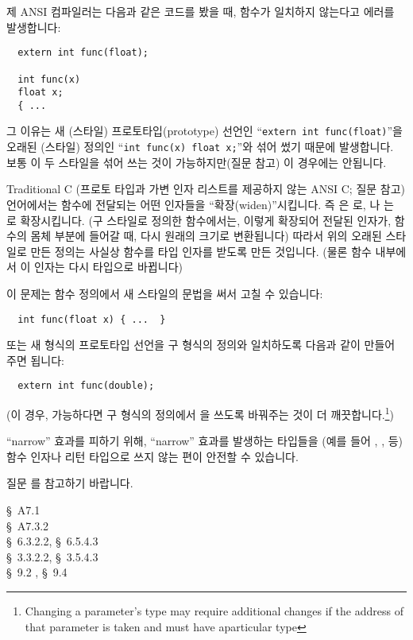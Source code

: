 \begin{faq}
	제 ANSI 컴파일러는 다음과 같은 코드를 봤을 때, 함수가 일치하지 않는다고
	에러를 발생합니다:

\begin{verbatim}
  extern int func(float);

  int func(x)
  float x;
  { ...
\end{verbatim}

\A
        \begin{sloppypar}
	그 이유는 새 (스타일) 프로토타입(prototype) 선언인
	``\verb+extern int func(float)+''을 오래된 (스타일) 정의인
	``\verb+int func(x) float x;+''와 섞어 썼기 때문에 발생합니다.
	보통 이 두 스타일을 섞어 쓰는 것이 가능하지만(질문  참고)
	이 경우에는 안됩니다.

	Traditional C (프로토 타입과 가변 인자 리스트를 제공하지 않는 ANSI C;
	질문  참고) 언어에서는 함수에 전달되는 어떤 인자들을
	``확장(widen)''시킵니다.  즉 은 로,
	나 는 로 확장시킵니다.
	(구 스타일로 정의한 함수에서는, 이렇게 확장되어 전달된 인자가,
	함수의 몸체 부분에 들어갈 때, 다시 원래의 크기로 변환됩니다)
        따라서 위의 오래된 스타일로 만든 정의는 사실상  함수를
         타입 인자를 받도록 만든 것입니다. (물론 함수 내부에서
        이 인자는 다시  타입으로 바뀝니다)
        \end{sloppypar}
	이 문제는 함수 정의에서 새 스타일의 문법을 써서 고칠 수 있습니다:
\begin{verbatim}
  int func(float x) { ...  }
\end{verbatim}

	또는 새 형식의 프로토타입 선언을 구 형식의 정의와
	일치하도록 다음과 같이 만들어 주면 됩니다:
\begin{verbatim}
  extern int func(double);
\end{verbatim}
	\noindent (이 경우, 가능하다면 구 형식의 정의에서 을 쓰도록
	바꿔주는 것이 더 깨끗합니다.\footnote{Changing a parameter's type
          may require additional changes if the address of that parameter
          is taken and must have aparticular type})

        ``narrow'' 효과를 피하기 위해, ``narrow'' 효과를 발생하는 타입들을
        (예를 들어 , ,  등) 함수 인자나
        리턴 타입으로 쓰지 않는 편이 안전할 수 있습니다.

	질문 를 참고하기 바랍니다.

\R
	\cite{kr1} \S\ A7.1  \\
	\cite{kr2} \S\ A7.3.2  \\
	\cite{c89} \S\ 6.3.2.2, \S\ 6.5.4.3 \\
	\cite{rationale} \S\ 3.3.2.2, \S\ 3.5.4.3 \\
	\cite{hs} \S\ 9.2 , \S\ 9.4  \\


\end{faq}
